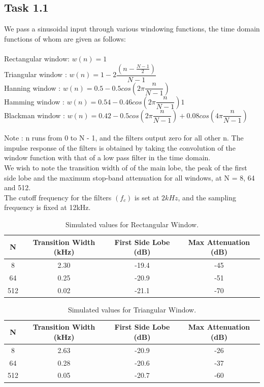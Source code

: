 \documentclass{article}
\begin{document}
\subsection{Task 1.1}
We pass a sinusoidal input through various windowing functions, the time domain functions of whom are given as follows: \\\\
    Rectangular window: $w(n) = 1 $ \\
    Triangular window : $w(n) = 1 - 2\dfrac{(n - \frac{N - 1}{2})}{N - 1}$ \\
    Hanning window : $w(n) = 0.5 - 0.5cos(2\pi{\dfrac{n}{N - 1}})$ \\
    Hamming window : $w(n) = 0.54 - 0.46cos(2\pi{\dfrac{n}{N - 1}})1$ \\
    Blackman window : $w(n) = 0.42 - 0.5cos(2\pi{\dfrac{n}{N - 1}}) + 0.08cos(4\pi{\dfrac{n}{N - 1}})$\\\\
Note : n runs from 0 to N - 1, and the filters output zero for all other n. The impulse response of the filters is obtained by taking the convolution of the window function with that of a low pass filter in the time domain.
\\
We wish to note the transition width of of the main lobe, the peak of the first side lobe and the maximum stop-band attenuation for all windows, at N = 8, 64 and 512.
\\
The cutoff frequency for the filters $(f_c)$ is set at $2kHz$, and the sampling frequency is fixed at 12kHz.
\clearpage
\begin{table}
\centering
\caption{Simulated values for Rectangular Window.}
\begin{tabular}{||c c c c||} 
 \hline
 N & Transition Width (kHz) & First Side Lobe (dB) & Max Attenuation (dB)\\ [0.5ex] 
 \hline\hline
 8 & 2.30 & -19.4 & -45 \\ 
 64 & 0.25 & -20.9 & -51 \\
 512 & 0.02 & -21.1 & -70 \\   
 \hline
\end{tabular}
\end{table}

\begin{table}
\centering
\caption{Simulated values for Triangular Window.}
\begin{tabular}{||c c c c||} 
 \hline
 N & Transition Width (kHz) & First Side Lobe (dB) & Max Attenuation (dB)\\ [0.5ex] 
 \hline\hline
 8 & 2.63 & -20.9 & -26 \\ 
 64 & 0.28 & -20.6 & -37 \\
 512 & 0.05 & -20.7 & -60 \\   
 \hline
\end{tabular}
\end{table}
\end{document}
